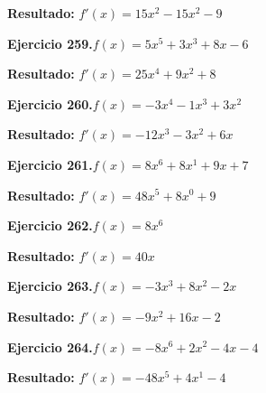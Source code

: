 \documentclass[10pt,a4paper]{article}
\begin{document}
\begin{solbox}
\textbf{Resultado:} \(\displaystyle f'(x) = 15x^{2} -15x^{2} -9\)
\end{solbox}

\newpage
\begin{ejbox}
\textbf{Ejercicio 259.}\quad $f(x) = 5x^{5} +3x^{3} +8x -6$
\end{ejbox}

\begin{solbox}
\textbf{Resultado:} \(\displaystyle f'(x) = 25x^{4} +9x^{2} +8\)
\end{solbox}

\begin{ejbox}
\textbf{Ejercicio 260.}\quad $f(x) = -3x^4 -1x^3 +3x^2$
\end{ejbox}

\begin{solbox}
\textbf{Resultado:} \(\displaystyle f'(x) = -12x^3 -3x^2 +6x\)
\end{solbox}

\begin{ejbox}
\textbf{Ejercicio 261.}\quad $f(x) = 8x^{6} +8x^{1} +9x +7$
\end{ejbox}

\begin{solbox}
\textbf{Resultado:} \(\displaystyle f'(x) = 48x^{5} +8x^{0} +9\)
\end{solbox}

\newpage
\begin{ejbox}
\textbf{Ejercicio 262.}\quad $f(x) = 8x^{6}$
\end{ejbox}

\begin{solbox}
\textbf{Resultado:} \(\displaystyle f'(x) = 40x\)
\end{solbox}

\begin{ejbox}
\textbf{Ejercicio 263.}\quad $f(x) = -3x^3 +8x^2 -2x$
\end{ejbox}

\begin{solbox}
\textbf{Resultado:} \(\displaystyle f'(x) = -9x^2 +16x -2\)
\end{solbox}

\begin{ejbox}
\textbf{Ejercicio 264.}\quad $f(x) = -8x^{6} +2x^{2} -4x -4$
\end{ejbox}

\begin{solbox}
\textbf{Resultado:} \(\displaystyle f'(x) = -48x^{5} +4x^{1} -4\)
\end{solbox}
\end{document}
